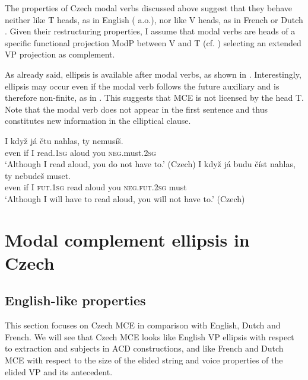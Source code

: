 \documentclass[output=paper,colorlinks,citecolor=brown,
modfonts
]{langscibook}
\begin{document}
\noindent The properties of Czech modal verbs discussed above suggest that they behave neither like T heads, as in English (\citealt{Sag1976} a.o.), nor like V heads, as in French or Dutch \citep{Aelbrecht2008,Dagnac2010}. Given their restructuring properties, I assume that modal verbs are heads of a specific functional projection ModP between V and T (cf. \citealt{Cinque2004}) selecting an extended VP projection as complement.

As already said, ellipsis is available after modal verbs, as shown in . Interestingly,  ellipsis may occur even if the modal verb follows the future auxiliary and is therefore non-finite, as in . This suggests that MCE is not licensed by the head T. Note that the modal verb does not appear in the first sentence and thus constitutes new information in the elliptical clause. 

\begin{exe}
\ex \label{17} 
\begin{xlist}
\ex \label{17a}\gll  I když  já čtu nahlas, ty    nemusíš.\\
 even if I read.\textsc{1sg} aloud   you \textsc{neg}.must.\textsc{2sg} \\
\glt `Although I read aloud, you do not have to.' \hfill (Czech)
\ex \label{17b} \gll I když   já budu číst nahlas,  ty    nebudeš  muset.\\
even if  I   \textsc{fut}.\textsc{1sg} read aloud you \textsc{neg}.\textsc{fut}.\textsc{2sg} must\\
\glt `Although I will have to read aloud, you will not have to.' \hfill (Czech)
\end{xlist}
\end{exe}

\section{Modal complement ellipsis in Czech} \label{sec:4} 

\subsection{English-like properties}\label{sec:4.1}

\sloppy This section focuses on Czech MCE in comparison with English, Dutch and French. We will see that Czech MCE looks like English VP ellipsis with respect to extraction and subjects in ACD constructions, and like French and Dutch MCE with respect to the size of the elided string and voice properties of the elided VP and its antecedent. 
\end{document}

